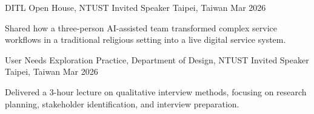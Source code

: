

\begin{cventries}

  \cventry
    {DITL Open House, NTUST} %
    {Invited Speaker} %
    {Taipei, Taiwan} %
    {Mar 2026} %
    {
      \begin{cvitems} %
        \item {Shared how a three-person AI-assisted team transformed complex service workflows in a traditional religious setting into a live digital service system.}
      \end{cvitems}
    }

  \cventry
    {User Needs Exploration Practice, Department of Design, NTUST} %
    {Invited Speaker} %
    {Taipei, Taiwan} %
    {Mar 2026} %
    {
      \begin{cvitems} %
        \item {Delivered a 3-hour lecture on qualitative interview methods, focusing on research planning, stakeholder identification, and interview preparation.}
      \end{cvitems}
    }
\end{cventries}
